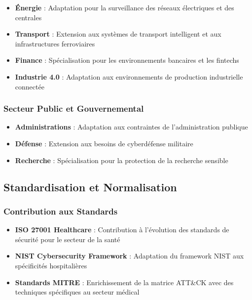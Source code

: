 \begin{itemize}
    \item \textbf{Énergie} : Adaptation pour la surveillance des réseaux électriques et des centrales
    \item \textbf{Transport} : Extension aux systèmes de transport intelligent et aux infrastructures ferroviaires
    \item \textbf{Finance} : Spécialisation pour les environnements bancaires et les fintechs
    \item \textbf{Industrie 4.0} : Adaptation aux environnements de production industrielle connectée
\end{itemize}

\subsubsection{Secteur Public et Gouvernemental}

\begin{itemize}
    \item \textbf{Administrations} : Adaptation aux contraintes de l'administration publique
    \item \textbf{Défense} : Extension aux besoins de cyberdéfense militaire
    \item \textbf{Recherche} : Spécialisation pour la protection de la recherche sensible
\end{itemize}

\subsection{Standardisation et Normalisation}

\subsubsection{Contribution aux Standards}

\begin{itemize}
    \item \textbf{ISO 27001 Healthcare} : Contribution à l'évolution des standards de sécurité pour le secteur de la santé
    \item \textbf{NIST Cybersecurity Framework} : Adaptation du framework NIST aux spécificités hospitalières
    \item \textbf{Standards MITRE} : Enrichissement de la matrice ATT\&CK avec des techniques spécifiques au secteur médical
\end{itemize}

